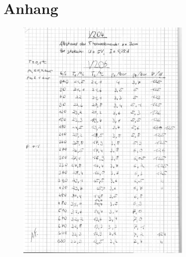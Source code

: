 \newpage
\appendix
\section{Anhang}
\label{sec:anhang}
\begin{figure}[ht]
  \centering
  \includegraphics[width=0.75\textwidth]{content/originaldaten/1.jpg}
\end{figure}
